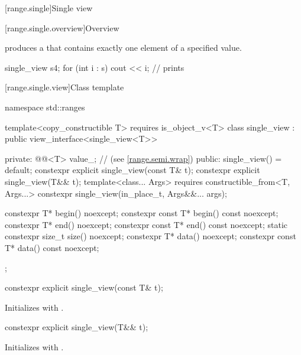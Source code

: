 [range.single]{Single view}

[range.single.overview]{Overview}

\pnum
{} produces a  that contains
exactly one element of a specified value.

\pnum
\begin{example}
\begin{codeblock}
single_view s{4};
for (int i : s)
  cout << i; // prints 
\end{codeblock}
\end{example}

[range.single.view]{Class template }

\begin{codeblock}
namespace std::ranges {
  template<copy_constructible T>
    requires is_object_v<T>
  class single_view : public view_interface<single_view<T>> {
  private:
    @@<T> value_;      // \expos{} (see \ref{range.semi.wrap})
  public:
    single_view() = default;
    constexpr explicit single_view(const T& t);
    constexpr explicit single_view(T&& t);
    template<class... Args>
      requires constructible_from<T, Args...>
    constexpr single_view(in_place_t, Args&&... args);

    constexpr T* begin() noexcept;
    constexpr const T* begin() const noexcept;
    constexpr T* end() noexcept;
    constexpr const T* end() const noexcept;
    static constexpr size_t size() noexcept;
    constexpr T* data() noexcept;
    constexpr const T* data() const noexcept;
  };
}
\end{codeblock}

%
\begin{itemdecl}
constexpr explicit single_view(const T& t);
\end{itemdecl}

\begin{itemdescr}
\pnum
\effects Initializes  with .
\end{itemdescr}

%
\begin{itemdecl}
constexpr explicit single_view(T&& t);
\end{itemdecl}

\begin{itemdescr}
\pnum
\effects Initializes  with .
\end{itemdescr}

